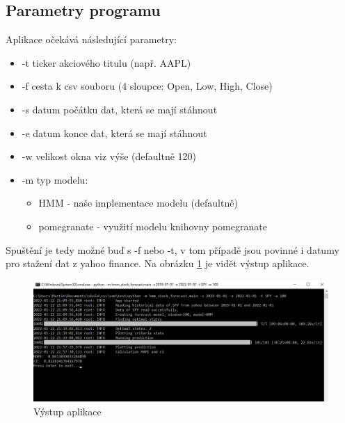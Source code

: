 \subsection{Parametry programu}
Aplikace očekává následující parametry:
\begin{itemize}
    \item -t ticker akciového titulu (např. AAPL)
    \item -f cesta k csv souboru (4 sloupce: Open, Low, High, Close)
    \item -s datum počátku dat, která se mají stáhnout
    \item -e datum konce dat, která se mají stáhnout
    \item -w velikost okna viz výše (defaultně 120)
    \item -m typ modelu:
    \begin{itemize}
        \item HMM - naše implementace modelu (defaultně)
        \item pomegranate - využití modelu knihovny pomegranate
    \end{itemize}
\end{itemize}
Spuštění je tedy možné buď s -f nebo -t, v tom případě jsou povinné i datumy pro stažení dat z yahoo finance.
Na obrázku \ref{fig:output} je vidět výstup aplikace.

\begin{figure}[h]
    \includegraphics[width=1\textwidth]{img/output}
    \caption{Výstup aplikace}
    \label{fig:output}
\end{figure}

\clearpage
